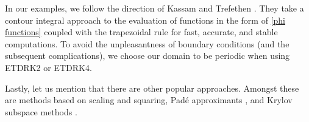 In our examples, we follow the direction of Kassam and Trefethen \cite{kassam2005fourth}. They take a contour integral approach to the evaluation of functions in the form of \cref{phi functions} coupled with the trapezoidal rule for fast, accurate, and stable computations. To avoid the unpleasantness of boundary conditions (and the subsequent complications), we choose our domain to be periodic when using ETDRK2 or ETDRK4. 

Lastly, let us mention that there are other popular approaches. Amongst these are methods based on scaling and squaring, Pad\'{e} approximants \cite{moler2003nineteen,higham2008functions}, and Krylov subspace methods  \cite{hochbruck1997krylov,sidje1998expokit,simoncini2007recent}.


